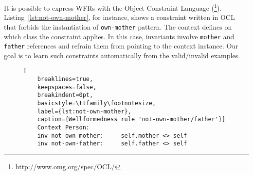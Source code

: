 It is possible to express WFRs with the Object Constraint Language (\OCL\footnote{http://www.omg.org/spec/OCL/}).
Listing~\ref{lst:not-own-mother}, for instance, shows a constraint written in OCL that forbids the instantiation of \texttt{own-mother} pattern. The context defines on which class the constraint applies. In this case, invariants involve \texttt{mother} and \texttt{father} references and refrain them from pointing to the context instance. %
Our goal is to learn such constraints automatically from the valid/invalid examples.
\begin{figure}
	\centering
	\begin{lstlisting}[
	breaklines=true,
	keepspaces=false,
	breakindent=0pt,
	basicstyle=\ttfamily\footnotesize,
	label={lst:not-own-mother},
	caption={Wellformedness rule 'not-own-mother/father'}]
	Context Person:
	inv not-own-mother: 	self.mother <> self
	inv not-own-father: 	self.father <> self
	\end{lstlisting}
\end{figure}




